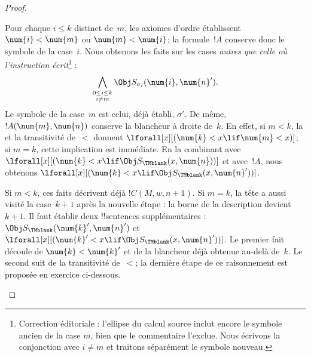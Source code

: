 \documentclass[../../../include/open-logic-section]{subfiles}
\begin{document}
\begin{proof}
\begin{enumerate}
  Pour chaque $i\le k$ distinct de~$m$, les axiomes d'ordre
  établissent $\num{i}<\num{m}$ ou
  $\num{m}<\num{i}$; la formule~$!A$ conserve donc le symbole
  de la case~$i$. Nous obtenons les faits sur les cases
  \emph{autres que celle où l'instruction écrit}\footnote{Correction éditoriale : l'ellipse du calcul source inclut encore le symbole ancien de la case $m$, bien que le commentaire l'exclue. Nous écrivons la conjonction avec $i\ne m$ et traitons séparément le symbole nouveau.} :
\[
\bigwedge_{\substack{0\le i\le k\\i\ne m}}
  \Obj S_{\sigma_i}(\num{i},\num{n}').
\]
  Le symbole de la case~$m$ est celui, déjà établi,
  $\sigma'$. De même, $!A(\num{m},\num{n})$ conserve la
  blancheur à droite de~$k$. En effet, si $m<k$,
  la  et la transitivité de~$<$ donnent
  $\lforall[x][(\num{k}<x\lif\num{m}<x)]$; si $m=k$,
  cette implication est immédiate. En la combinant avec
  $\lforall[x][(\num{k}<x\lif
  \Obj S_\TMblank(x,\num{n}))]$ et avec~$!A$, nous obtenons
  $\lforall[x][(\num{k}<x\lif
  \Obj S_\TMblank(x,\num{n}'))]$.

  Si $m<k$, ces faits décrivent déjà $!C(M,w,n+1)$.
  Si $m=k$, la tête a aussi visité la case~$k+1$ après la
  nouvelle étape : la borne de la description devient~$k+1$.
  Il faut établir deux !!{sentence}s supplémentaires :
  $\Obj S_\TMblank(\num{k}',\num{n}')$
  et $\lforall[x][(\num{k}'<x\lif
  \Obj S_\TMblank(x,\num{n}'))]$. Le premier fait découle de
  $\num{k}<\num{k}'$ et de la blancheur déjà obtenue au-delà
  de~$k$. Le second suit de la transitivité de~$<$; la dernière
  étape de ce raisonnement est proposée en exercice ci-dessous.


\end{enumerate}
\end{proof}
\end{document}
